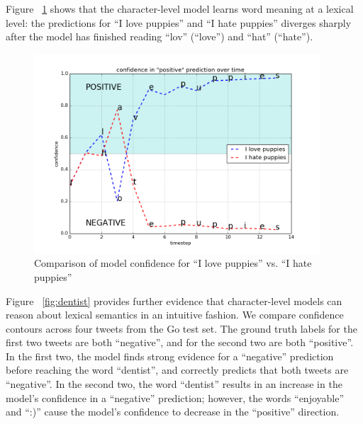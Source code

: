 \documentclass{article} %
\begin{document}
Figure ~\ref{fig:puppies} shows that the character-level model learns word meaning at a lexical level: the predictions for ``I love puppies'' and ``I hate puppies'' diverges sharply after the model has finished reading ``lov'' (``love'') and ``hat'' (``hate'').

\begin{figure}[h!]

\begin{center}
\includegraphics[width=0.95\textwidth]{figs/puppies}
\end{center}
\caption{Comparison of model confidence for ``I love puppies'' vs. ``I hate puppies''}
\label{fig:puppies}
\end{figure}

Figure ~\ref{fig:dentist} provides further evidence that character-level models can reason about lexical semantics in an intuitive fashion. We compare confidence contours across four tweets from the Go test set. The ground truth labels for the first two tweets are both ``negative'', and for the second two are both ``positive''. In the first two, the model finds strong evidence for a ``negative'' prediction before reaching the word ``dentist'', and correctly predicts that both tweets are ``negative''. In the second two, the word ``dentist'' results in an increase in the model's confidence in a ``negative'' prediction; however, the words ``enjoyable'' and ``:)'' cause the model's confidence to decrease in the ``positive'' direction. 
\end{document}
